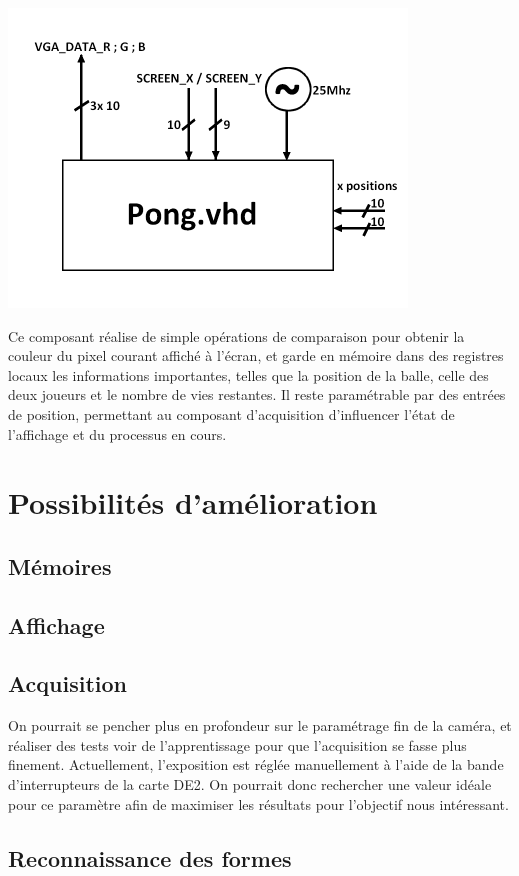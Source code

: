 \documentclass[10pt,a4paper]{report}
\begin{document}
\begin{center}
\includegraphics[width=300pt]{gfx/pong.png}
\end{center}

Ce composant réalise de simple opérations de comparaison pour obtenir la couleur du pixel courant affiché à l'écran, et garde en mémoire dans des registres locaux les informations importantes, telles que la position de la balle, celle des deux joueurs et le nombre de vies restantes. Il reste paramétrable par des entrées de position, permettant au composant d'acquisition d'influencer l'état de l'affichage et du processus en cours.

\chapter{Possibilités d'amélioration}

\section{Mémoires}

\section{Affichage}



\section{Acquisition}

On pourrait se pencher plus en profondeur sur le paramétrage fin de la caméra, et réaliser des tests voir de l'apprentissage pour que l'acquisition se fasse plus finement. Actuellement, l'exposition est réglée manuellement à l'aide de la bande d'interrupteurs de la carte DE2. On pourrait donc rechercher une valeur idéale pour ce paramètre afin de maximiser les résultats pour l'objectif nous intéressant.

\section{Reconnaissance des formes}
\end{document}
